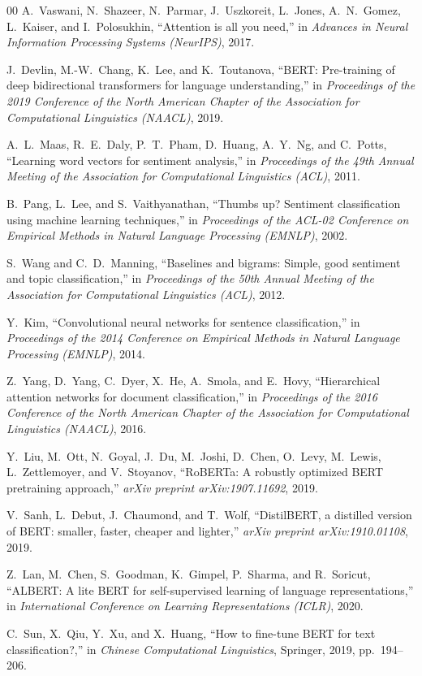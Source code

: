 \documentclass[conference]{IEEEtran}
\begin{document}

\begin{thebibliography}{00}
A.~Vaswani, N.~Shazeer, N.~Parmar, J.~Uszkoreit, L.~Jones, A.~N.~Gomez, L.~Kaiser, and I.~Polosukhin, ``Attention is all you need,'' in \emph{Advances in Neural Information Processing Systems (NeurIPS)}, 2017.

J.~Devlin, M.-W.~Chang, K.~Lee, and K.~Toutanova, ``BERT: Pre-training of deep bidirectional transformers for language understanding,'' in \emph{Proceedings of the 2019 Conference of the North American Chapter of the Association for Computational Linguistics (NAACL)}, 2019.

A.~L.~Maas, R.~E.~Daly, P.~T.~Pham, D.~Huang, A.~Y.~Ng, and C.~Potts, ``Learning word vectors for sentiment analysis,'' in \emph{Proceedings of the 49th Annual Meeting of the Association for Computational Linguistics (ACL)}, 2011.

B.~Pang, L.~Lee, and S.~Vaithyanathan, ``Thumbs up? Sentiment classification using machine learning techniques,'' in \emph{Proceedings of the ACL-02 Conference on Empirical Methods in Natural Language Processing (EMNLP)}, 2002.

S.~Wang and C.~D.~Manning, ``Baselines and bigrams: Simple, good sentiment and topic classification,'' in \emph{Proceedings of the 50th Annual Meeting of the Association for Computational Linguistics (ACL)}, 2012.

Y.~Kim, ``Convolutional neural networks for sentence classification,'' in \emph{Proceedings of the 2014 Conference on Empirical Methods in Natural Language Processing (EMNLP)}, 2014.

Z.~Yang, D.~Yang, C.~Dyer, X.~He, A.~Smola, and E.~Hovy, ``Hierarchical attention networks for document classification,'' in \emph{Proceedings of the 2016 Conference of the North American Chapter of the Association for Computational Linguistics (NAACL)}, 2016.

Y.~Liu, M.~Ott, N.~Goyal, J.~Du, M.~Joshi, D.~Chen, O.~Levy, M.~Lewis, L.~Zettlemoyer, and V.~Stoyanov, ``RoBERTa: A robustly optimized BERT pretraining approach,'' \emph{arXiv preprint arXiv:1907.11692}, 2019.

V.~Sanh, L.~Debut, J.~Chaumond, and T.~Wolf, ``DistilBERT, a distilled version of BERT: smaller, faster, cheaper and lighter,'' \emph{arXiv preprint arXiv:1910.01108}, 2019.

Z.~Lan, M.~Chen, S.~Goodman, K.~Gimpel, P.~Sharma, and R.~Soricut, ``ALBERT: A lite BERT for self-supervised learning of language representations,'' in \emph{International Conference on Learning Representations (ICLR)}, 2020.

C.~Sun, X.~Qiu, Y.~Xu, and X.~Huang, ``How to fine-tune BERT for text classification?,'' in \emph{Chinese Computational Linguistics}, Springer, 2019, pp.~194--206.

\end{thebibliography}
\end{document}
